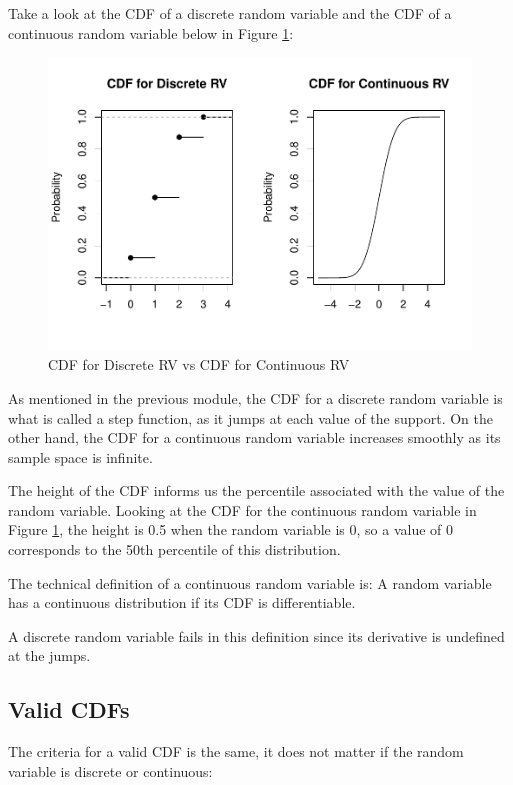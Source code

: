 \documentclass[
]{book}
\begin{document}
Take a look at the CDF of a discrete random variable and the CDF of a continuous random variable below in Figure \ref{fig:4-compare}:

\begin{figure}
\centering
\includegraphics{bookdown-demo_files/figure-latex/4-compare-1.pdf}
\caption{\label{fig:4-compare}CDF for Discrete RV vs CDF for Continuous RV}
\end{figure}

As mentioned in the previous module, the CDF for a discrete random variable is what is called a step function, as it jumps at each value of the support. On the other hand, the CDF for a continuous random variable increases smoothly as its sample space is infinite.

The height of the CDF informs us the percentile associated with the value of the random variable. Looking at the CDF for the continuous random variable in Figure \ref{fig:4-compare}, the height is 0.5 when the random variable is 0, so a value of 0 corresponds to the 50th percentile of this distribution.

The technical definition of a continuous random variable is: A random variable has a continuous distribution if its CDF is differentiable.

A discrete random variable fails in this definition since its derivative is undefined at the jumps.

\subsection{Valid CDFs}\label{valid-cdfs-1}

The criteria for a valid CDF is the same, it does not matter if the random variable is discrete or continuous:
\end{document}
